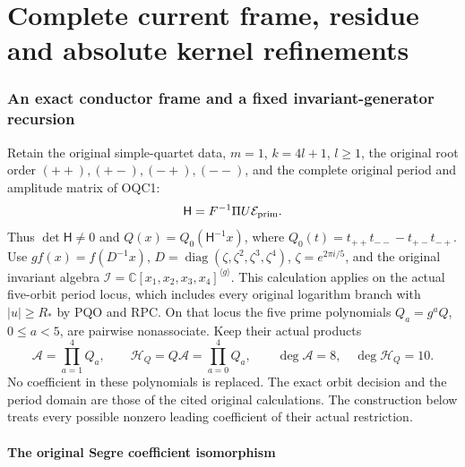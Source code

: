 \documentclass[11pt,a4paper]{article}
\begin{document}



\clearpage
\part*{Complete current frame, residue and absolute kernel refinements}

\clearpage
\section{An exact conductor frame and a fixed invariant-generator recursion}
\label{sec:OCF}

Retain the original simple-quartet data, $m=1$, $k=4l+1$,
$l\geq1$, the original root order $(++),(+-),(-+),(--)$, and
the complete original period and amplitude matrix of OQC1:
\[
                  \mathsf H=F^{-1}\Pi U\mathcal E_{\rm prim}.
\]
Thus $\det\mathsf H\ne0$ and
$Q(x)=Q_0(\mathsf H^{-1}x)$, where
$Q_0(t)=t_{++}t_{--}-t_{+-}t_{-+}$.
Use $g f(x)=f(D^{-1}x)$,
$D=\operatorname{diag}(\zeta,\zeta^2,\zeta^3,\zeta^4)$,
$\zeta=e^{2\pi i/5}$, and the original invariant algebra
$\mathscr I=\mathbb C[x_1,x_2,x_3,x_4]^{\langle g\rangle}$.
This calculation applies on the actual five-orbit period locus,
which includes every original logarithm branch with $|u|\geq R_*$
by PQO and RPC. On that locus the five prime polynomials
$Q_a=g^aQ$, $0\leq a<5$, are pairwise nonassociate. Keep their
actual products
\[
 \mathcal A=\prod_{a=1}^4Q_a,\qquad
 \mathcal H_Q=Q\mathcal A=\prod_{a=0}^4Q_a,
 \qquad \deg\mathcal A=8,\quad\deg\mathcal H_Q=10.
 \tag{OCF1}
\]
No coefficient in these polynomials is replaced. The exact orbit
decision and the period domain are those of the cited original
calculations. The construction below treats every possible nonzero
leading coefficient of their actual restriction.

\subsection{The original Segre coefficient isomorphism}
\end{document}
